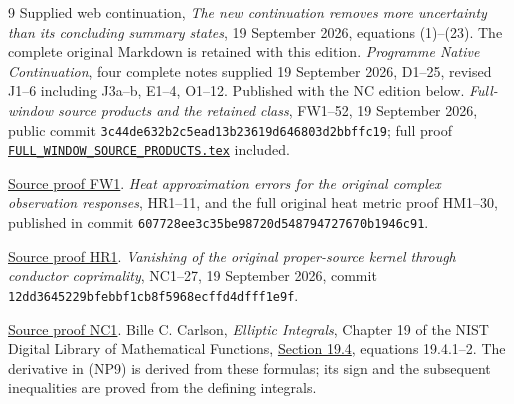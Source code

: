 \documentclass[11pt]{article}
\begin{document}
\begin{thebibliography}{9}
 Supplied web continuation,
\emph{The new continuation removes more uncertainty than its concluding
summary states}, 19 September 2026, equations (1)--(23).
The complete original Markdown is retained with this edition.
 \emph{Programme Native Continuation}, four complete
notes supplied 19 September 2026, D1--25, revised J1--6 including
J3a--b, E1--4, O1--12. Published with the NC edition below.
 \emph{Full-window source products and the retained class},
FW1--52, 19 September 2026, public commit
\texttt{3c44de632b2c5ead13b23619d646803d2bbffc19};
full proof \href{https://github.com/KokunoYumeto/zeta-function-research-reader/blob/5992ad50c0f2a06921f1fcaded7b4e38097c0739/workbenches/splitzero-tandem/continuations/20260920-original-kernel-mixed-determinants/providers/FULL_WINDOW_SOURCE_PRODUCTS.tex\#L1}{\texttt{FULL\_WINDOW\_SOURCE\_PRODUCTS.tex}} included.

\href{https://github.com/KokunoYumeto/zeta-function-research-reader/blob/5992ad50c0f2a06921f1fcaded7b4e38097c0739/workbenches/splitzero-tandem/continuations/20260920-original-kernel-mixed-determinants/providers/FULL_WINDOW_SOURCE_PRODUCTS.tex\#L28}{Source proof FW1}.
 \emph{Heat approximation errors for the original complex
observation responses}, HR1--11, and the full original heat metric
proof HM1--30, published in commit
\texttt{607728ee3c35be98720d548794727670b1946c91}.

\href{https://github.com/KokunoYumeto/zeta-function-research-reader/blob/5992ad50c0f2a06921f1fcaded7b4e38097c0739/workbenches/splitzero-tandem/continuations/20260920-original-kernel-mixed-determinants/providers/HEAT_OBSERVATION_RESPONSE_ERRORS.tex\#L22}{Source proof HR1}.
 \emph{Vanishing of the original proper-source kernel through
conductor coprimality}, NC1--27, 19 September 2026, commit
\texttt{12dd3645229bfebbf1cb8f5968ecffd4dfff1e9f}.

\href{https://github.com/KokunoYumeto/zeta-function-research-reader/blob/5992ad50c0f2a06921f1fcaded7b4e38097c0739/workbenches/splitzero-tandem/continuations/20260920-original-kernel-mixed-determinants/providers/ORIGINAL_CONDUCTOR_COPRIMALITY.tex\#L41}{Source proof NC1}.
 Bille C. Carlson, \emph{Elliptic Integrals}, Chapter 19
of the NIST Digital Library of Mathematical Functions,
\href{https://dlmf.nist.gov/19.4}{Section 19.4}, equations 19.4.1--2.
The derivative in (NP9) is derived from these formulas; its sign
and the subsequent inequalities are proved from the defining integrals.
\end{thebibliography}
\end{document}
